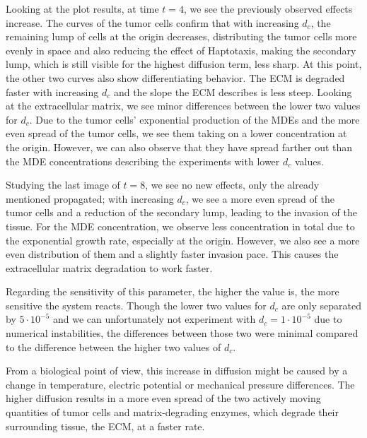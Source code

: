 Looking at the plot results, at time $t=4$, we see the previously observed effects increase. The curves of the tumor cells confirm that with increasing $d_c$, the remaining lump of cells at the origin decreases, distributing the tumor cells more evenly in space and also reducing the effect of Haptotaxis, making the secondary lump, which is still visible for the highest diffusion term, less sharp. At this point, the other two curves also show differentiating behavior. The ECM is degraded faster with increasing $d_c$ and the slope the ECM describes is less steep. Looking at the extracellular matrix, we see minor differences between the lower two values for $d_c$. Due to the tumor cells' exponential production of the MDEs and the more even spread of the tumor cells, we see them taking on a lower concentration at the origin. However, we can also observe that they have spread farther out than the MDE concentrations describing the experiments with lower $d_c$ values.

Studying the last image of $t=8$, we see no new effects, only the already mentioned propagated; with increasing $d_c$, we see a more even spread of the tumor cells and a reduction of the secondary lump, leading to the invasion of the tissue. For the MDE concentration, we observe less concentration in total due to the exponential growth rate, especially at the origin. However, we also see a more even distribution of them and a slightly faster invasion pace. This causes the extracellular matrix degradation to work faster.

Regarding the sensitivity of this parameter, the higher the value is, the more sensitive the system reacts. Though the lower two values for $d_c$ are only separated by $5\cdot 10^{-5}$ and we can unfortunately not experiment with $d_c=1 \cdot 10^{-5}$ due to numerical instabilities, the differences between those two were minimal compared to the difference between the higher two values of $d_c$.

From a biological point of view, this increase in diffusion might be caused by a change in temperature, electric potential or mechanical pressure differences. The higher diffusion results in a more even spread of the two actively moving quantities of tumor cells and matrix-degrading enzymes, which degrade their surrounding tissue, the ECM, at a faster rate.



